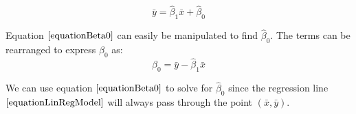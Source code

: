 \begin{skeleton}
	\begin{equation}
	\label{equationBeta0}
	\bar{y} = \hat{\beta}_{1} \bar{x} + \hat{\beta}_{0}
	\end{equation}
\end{skeleton}

\begin{nt}
Equation $\ref{equationBeta0}$ can easily be manipulated to
find $\hat{\beta}_{0}$.
The terms can be rearranged to express $\hat{\beta}_{0}$ as:
	\begin{equation}
	\hat{\beta}_{0} = \bar{y} - \hat{\beta}_{1} \bar{x}
	\end{equation}
\end{nt}

\begin{nt}
We can use equation $\ref{equationBeta0}$ to solve for $\hat{\beta}_{0}$
since the regression line $\ref{equationLinRegModel}$ will always pass
through the point $(\bar{x}, \bar{y})$.
\end{nt}


